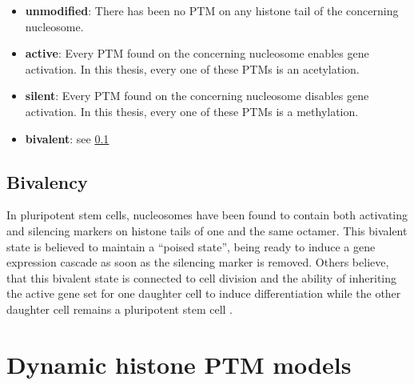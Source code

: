             \begin{itemize}
                \item \textbf{unmodified}: There has been no PTM on any histone tail of the concerning nucleosome.
                \item \textbf{active}: Every PTM found on the concerning nucleosome enables gene activation. In this thesis, every one of these PTMs is an acetylation.
                \item \textbf{silent}: Every PTM found on the concerning nucleosome disables gene activation. In this thesis, every one of these PTMs is a methylation.
                \item \textbf{bivalent}: see \ref{sec:bivalency}
            \end{itemize}
        \subsection{Bivalency}
            \label{sec:bivalency}
            In pluripotent stem cells, nucleosomes have been found to contain both activating and silencing markers on histone tails of one and the same octamer. This bivalent state is believed to maintain a “poised state”, being ready to induce a gene expression cascade as soon as the silencing marker is removed. %
            Others believe, that this bivalent state is connected to cell division and the ability of inheriting the active gene set for one daughter cell to induce differentiation while the other daughter cell remains a pluripotent stem cell \cite{schuettengruber2017genome}. %
    \section{Dynamic histone PTM models}
